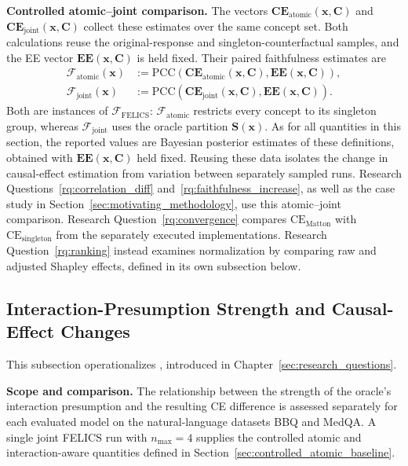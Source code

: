 \noindent\textbf{Controlled atomic--joint comparison.} The vectors $\mathbf{CE}_{\mathrm{atomic}}(\mathbf{x},\mathbf{C})$ and $\mathbf{CE}_{\mathrm{joint}}(\mathbf{x},\mathbf{C})$ collect these estimates over the same concept set. Both calculations reuse the original-response and singleton-counterfactual samples, and the EE vector $\mathbf{EE}(\mathbf{x},\mathbf{C})$ is held fixed. Their paired faithfulness estimates are
\begin{align}
	\label{eq:evaluation_f_atomic}
	\mathcal{F}_{\mathrm{atomic}}(\mathbf{x})
	 & :=\mathrm{PCC}\left(\mathbf{CE}_{\mathrm{atomic}}(\mathbf{x},\mathbf{C}),\mathbf{EE}(\mathbf{x},\mathbf{C})\right), \\
	\label{eq:evaluation_f_joint}
	\mathcal{F}_{\mathrm{joint}}(\mathbf{x})
	 & :=\mathrm{PCC}\left(\mathbf{CE}_{\mathrm{joint}}(\mathbf{x},\mathbf{C}),\mathbf{EE}(\mathbf{x},\mathbf{C})\right).
\end{align}
Both are instances of $\mathcal{F}_{\mathrm{FELICS}}$: $\mathcal{F}_{\mathrm{atomic}}$ restricts every concept to its singleton group, whereas $\mathcal{F}_{\mathrm{joint}}$ uses the oracle partition $\mathbf{S}(\mathbf{x})$. As for all quantities in this section, the reported values are Bayesian posterior estimates of these definitions, obtained with $\mathbf{EE}(\mathbf{x},\mathbf{C})$ held fixed.
Reusing these data isolates the change in causal-effect estimation from variation between separately sampled runs. Research Questions~\ref{rq:correlation_diff} and~\ref{rq:faithfulness_increase}, as well as the case study in Section~\ref{sec:motivating_methodology}, use this atomic--joint comparison. Research Question~\ref{rq:convergence} compares $\mathrm{CE}_{\mathrm{Matton}}$ with $\mathrm{CE}_{\mathrm{singleton}}$ from the separately executed implementations. Research Question~\ref{rq:ranking} instead examines normalization by comparing raw and adjusted Shapley effects, defined in its own subsection below.

\subsection{Interaction-Presumption Strength and Causal-Effect Changes}
This subsection operationalizes , introduced in Chapter~\ref{sec:research_questions}.

\noindent\textbf{Scope and comparison.} The relationship between the strength of the oracle's interaction presumption and the resulting CE difference is assessed separately for each evaluated model on the natural-language datasets BBQ and MedQA. A single joint FELICS run with $n_{\max}=4$ supplies the controlled atomic and interaction-aware quantities defined in Section~\ref{sec:controlled_atomic_baseline}.

